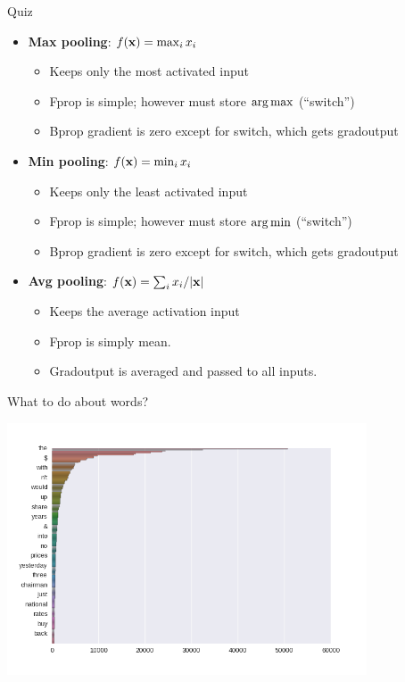 \documentclass{beamer}
\begin{document}
\begin{frame}{Quiz}
  \begin{itemize}
  \item \textbf{Max pooling}:  $f(\mathbf{x}) = \max_{i} x_i$
    
    \begin{itemize}
    \item Keeps only the most activated input
    \item Fprop is simple; however must store $\argmax$ (``switch'')
    \item Bprop gradient is zero except for switch, which gets gradoutput
    \end{itemize}
    \pause 

  \item \textbf{Min pooling}: $ f(\mathbf{x}) = \min_{i} x_i $
    \begin{itemize}
    \item Keeps only the least activated input
    \item Fprop is simple; however must store $\argmin$ (``switch'')
    \item Bprop gradient is zero except for switch, which gets gradoutput
    \end{itemize}
    \pause 
    
  \item \textbf{Avg pooling}: $ f(\mathbf{x}) = \sum_i x_i / |\mathbf{x}| $
    \begin{itemize}
    \item Keeps the average activation input
    \item Fprop is simply mean. 
    \item Gradoutput is averaged and passed to all inputs.
    \end{itemize}
  \end{itemize}
\end{frame}

\begin{frame}{What to do about words?}
  \begin{center}
    \includegraphics[width=0.8\textwidth]{../notebooks/zipf}         
  \end{center}
\end{frame}
\end{document}
